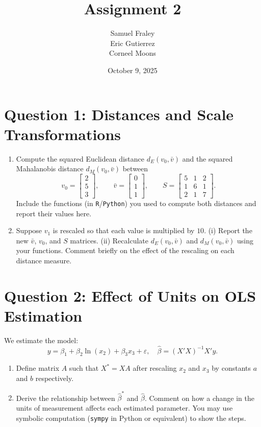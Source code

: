 \documentclass[12pt,a4paper]{article}
\title{Assignment 2}
\author{
  Samuel Fraley \\
  Eric Gutierrez \\
  Corneel Moons
}
\date{October 9, 2025}
\begin{document}
\maketitle
\tableofcontents
\newpage

\section*{Question 1: Distances and Scale Transformations}
\begin{enumerate}[label=(\alph*)]
  \item Compute the squared Euclidean distance $d_E(v_0, \bar{v})$ and the squared Mahalanobis distance $d_M(v_0, \bar{v})$ between
  \[
  v_0 = \begin{bmatrix}2 \\ 5 \\ 3\end{bmatrix},
  \qquad
  \bar{v} = \begin{bmatrix}0 \\ 1 \\ 1\end{bmatrix},
  \qquad
  S = 
  \begin{bmatrix}
  5 & 1 & 2 \\
  1 & 6 & 1 \\
  2 & 1 & 7
  \end{bmatrix}.
  \]
  Include the functions (in \texttt{R}/\texttt{Python}) you used to compute both distances and report their values here.

  \item Suppose $v_1$ is rescaled so that each value is multiplied by $10$.  
  (i) Report the new $\bar{v}$, $v_0$, and $S$ matrices.  
  (ii) Recalculate $d_E(v_0, \bar{v})$ and $d_M(v_0, \bar{v})$ using your functions.  
  Comment briefly on the effect of the rescaling on each distance measure.
\end{enumerate}

\newpage
\section*{Question 2: Effect of Units on OLS Estimation}
We estimate the model:
\[
y = \beta_1 + \beta_2 \ln(x_2) + \beta_3 x_3 + \varepsilon,
\quad \hat{\beta} = (X'X)^{-1} X'y.
\]

\begin{enumerate}[label=(\alph*)]
  \item Define matrix $A$ such that $X^* = X A$ after rescaling $x_2$ and $x_3$ by constants $a$ and $b$ respectively.
  \item Derive the relationship between $\hat{\beta}^*$ and $\hat{\beta}$.  
  Comment on how a change in the units of measurement affects each estimated parameter.  
  You may use symbolic computation (\texttt{sympy} in Python or equivalent) to show the steps.
\end{enumerate}
\end{document}
